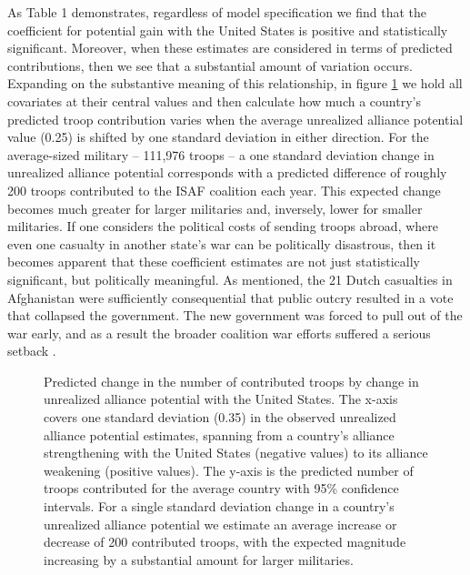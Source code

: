 \documentclass[12pt,letterpaper]{article}
\begin{document}
		\newpage
		
		\newpage

		As Table 1 demonstrates, regardless of model specification we find that the coefficient for potential gain with the United States is positive and statistically significant. Moreover, when these estimates are considered in terms of predicted contributions, then we see that a substantial amount of variation occurs. Expanding on the substantive meaning of this relationship, in figure \ref{fig:predict} we hold all covariates at their central values and then calculate how much a country's predicted troop contribution varies when the average unrealized alliance potential value (0.25) is shifted by one standard deviation in either direction. For the average-sized military -- 111,976 troops -- a one standard deviation change in unrealized alliance potential corresponds with a predicted difference of roughly 200 troops contributed to the ISAF coalition each year. This expected change becomes much greater for larger militaries and, inversely, lower for smaller militaries. If one considers the political costs of sending troops abroad, where even one casualty in another state's war can be politically disastrous, then it becomes apparent that these coefficient estimates are not just statistically significant, but politically meaningful. As mentioned, the 21 Dutch casualties in Afghanistan were sufficiently consequential that public outcry resulted in a vote that collapsed the government. The new government was forced to pull out of the war early, and as a result the broader coalition war efforts suffered a serious setback \citep[95-100]{massie_whydemocraticallies_2016}.

		\begin{figure}[p!]
			\centering
			\resizebox{1.05\linewidth}{!}{
				
			}
			\caption{Predicted change in the number of contributed troops by change in unrealized alliance potential with the United States. The x-axis covers one standard deviation (0.35) in the observed unrealized alliance potential estimates, spanning from a country's alliance strengthening with the United States (negative values) to its alliance weakening (positive values). The y-axis is the predicted number of troops contributed for the average country with 95\% confidence intervals. For a single standard deviation change in a country's unrealized alliance potential we estimate an average increase or decrease of 200 contributed troops, with the expected magnitude increasing by a substantial amount for larger militaries.}
			\label{fig:predict}
		\end{figure}
\end{document}
